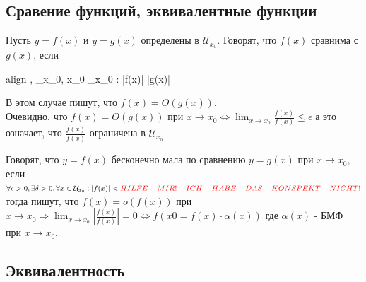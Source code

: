 \documentclass[oneside]{book}
\newcommand{\boxedeq}[2]{\begin{empheq}[box={\fboxsep=6pt\fbox}]{align}\label{#1}#2\end{empheq}}
\begin{document}
\begin{enumerate}
    \chapter[Сравнение функций]{Сравение функций, эквивалентные функции}
    Пусть $y = f(x)$ и $y = g(x)$ определены в $_{x_0}$. Говорят, что $f(x)$ сравнима с $g(x)$, если
    \boxedeq{eq:*}{
        \exists \epsilon, \exists \mathcal{U}_{x_0}, \forall x_0 \in \mathcal{U}_{x_0} : |f(x)| \leq \epsilon |g(x)|
    }
    В этом случае пишут, что $f(x) = O(g(x))$. \\
    Очевидно, что $f(x) = O(g(x))$ при $x \rightarrow x_0 \Leftrightarrow \lim_{x \rightarrow x_0}{\frac{f(x)}{f(x)}} \leq \epsilon$
    а это означает, что $\frac{f(x)}{f(x)}$ ограничена в $\mathcal{U}_{x_0}$.

    Говорят, что $y = f(x)$ бесконечно мала по сравнению $y = g(x)$ при $x \rightarrow x_0$, если
    $\forall \epsilon > 0, \exists \delta > 0, \forall x \in \mathcal{U}_{x_0} : |f(x)| < \\
    \textcolor{red}{\LARGE{HILFE\_MIR!\_ICH\_HABE\_DAS\_KONSPEKT\_NICHT!}}$ тогда пишут, что
    $f(x) = o(f(x))$ при $x \rightarrow x_0 \Rightarrow \lim_{x \rightarrow x_0}{|\frac{f(x)}{f(x)}|} = 0 \Leftrightarrow f(x0 = f(x) \cdot \alpha(x))$
    где $\alpha(x)$ - БМФ при $x \rightarrow x_0$.

    \section{Эквивалентность}


\end{enumerate}
\end{document}
